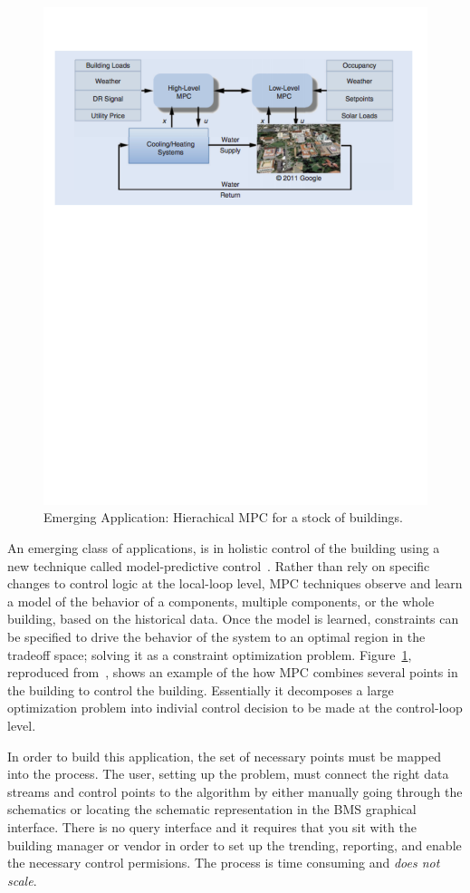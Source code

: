 \begin{figure}[t!] %
\centering
\includegraphics[width=0.75\columnwidth]{figs/mpc1}
\caption{Emerging Application: Hierachical MPC for a stock of buildings.}
\label{fig:mpc1}
\end{figure}

An emerging class of applications, is in holistic control of the building using a new technique called model-predictive control~\cite{MPC}.
Rather than rely on specific changes to control logic at the local-loop level, MPC techniques observe and learn a model
of the behavior of a components, multiple components, or the whole building, based on the historical data.  Once the model is learned, 
constraints can be specified to drive the behavior of the system to an optimal region in the tradeoff space; solving it as 
a constraint optimization problem.  Figure~\ref{fig:mpc1}, reproduced from~\cite{MPC}, shows an example of the how MPC combines 
several points in the building to control the building.  Essentially it decomposes a large optimization problem into indivial control 
decision to be made at the control-loop level.

In order to build this application, the set of necessary points must be mapped into the process.  The user, setting up the problem,
must connect the right data streams and control points to the algorithm by either manually going through the schematics or
locating the schematic representation in the BMS graphical interface.  There is no query interface and it requires that you sit
with the building manager or vendor in order to set up the trending, reporting, and enable the necessary control permisions.
The process is time consuming and \emph{does not scale}.

